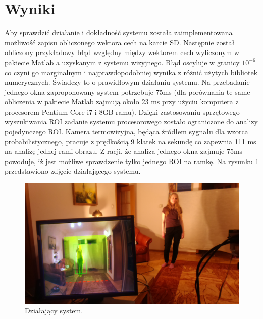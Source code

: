 \section{Wyniki}
Aby sprawdzić działanie i dokładność systemu została zaimplementowana możliwość zapisu obliczonego wektora cech na karcie SD.
Następnie został obliczony przykładowy błąd względny między wektorem cech wyliczonym w pakiecie Matlab a uzyskanym z systemu wizyjnego. %
Błąd oscyluje w granicy \(10^{-6}\) co czyni go marginalnym i najprawdopodobniej wynika z różnić użytych bibliotek numerycznych. Świadczy to o prawidłowym działaniu systemu.
Na przebadanie jednego okna zaproponowany system potrzebuje 75ms (dla porównania te same obliczenia w pakiecie Matlab zajmują około 23 ms przy użyciu komputera z procesorem Pentium Core i7 i 8GB ramu).
Dzięki zastosowaniu sprzętowego wyszukiwania ROI zadanie systemu procesorowego zostało ograniczone do analizy pojedynczego ROI. %
Kamera termowizyjna, będąca źródłem sygnału dla wzorca probabilistycznego, pracuje z prędkością 9 klatek na sekundę co zapewnia 111 ms na analizę jednej rami obrazu. Z racji, że analiza jednego okna zajmuje 75ms powoduje, iż jest możliwe sprawdzenie tylko jednego ROI na ramkę. Na rysunku \ref{fig:workingSystem} przedstawiono zdjęcie działającego systemu.

\begin{figure}
\centering
\includegraphics[width=0.8\linewidth]{images/workingSystem.jpg}
\caption[Działający system.]{Działający system.}
\label{fig:workingSystem}
\end{figure}

